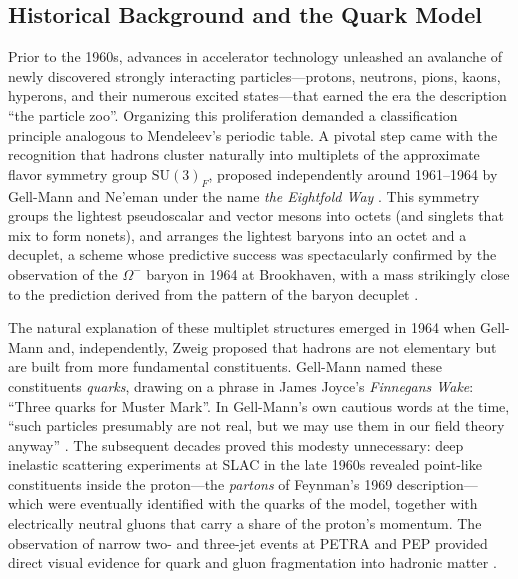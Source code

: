 \FloatBarrier

\subsection{Historical Background and the Quark Model}
\label{subsec:history-quark-model}

Prior to the 1960s, advances in accelerator technology unleashed an avalanche of
newly discovered strongly interacting particles---protons, neutrons, pions, kaons,
hyperons, and their numerous excited states---that earned the era the description
``the particle zoo''. Organizing this proliferation demanded a classification
principle analogous to Mendeleev's periodic table. A pivotal step came with the
recognition that hadrons cluster naturally into multiplets of the approximate
flavor symmetry group $\mathrm{SU(3)}_{F}$, proposed independently around
1961--1964 by Gell-Mann and Ne'eman under the name \emph{the Eightfold Way}
\cite[Ch.~2]{HalzenMartin1984}. This symmetry groups the lightest pseudoscalar and
vector mesons into octets (and singlets that mix to form nonets), and arranges the
lightest baryons into an octet and a decuplet, a scheme whose predictive success
was spectacularly confirmed by the observation of the $\Omega^-$ baryon in 1964 at
Brookhaven, with a mass strikingly close to the prediction derived from the pattern
of the baryon decuplet \cite[Ch.~7]{Amsler2018}.

The natural explanation of these multiplet structures emerged in 1964 when
Gell-Mann and, independently, Zweig proposed that hadrons are not elementary but
are built from more fundamental constituents. Gell-Mann named these constituents
\emph{quarks}, drawing on a phrase in James Joyce's \textit{Finnegans Wake}:
``Three quarks for Muster Mark''. In Gell-Mann's own cautious words at the time,
``such particles presumably are not real, but we may use them in our field theory
anyway'' \cite[Ch.~1]{Amsler2018}. The subsequent decades proved this modesty
unnecessary: deep inelastic scattering experiments at SLAC in the late 1960s
revealed point-like constituents inside the proton---the \emph{partons} of
Feynman's 1969 description---which were eventually identified with the quarks of
the model, together with electrically neutral gluons that carry a share of the
proton's momentum. The observation of narrow two- and three-jet events at PETRA
and PEP provided direct visual evidence for quark and gluon fragmentation into
hadronic matter \cite[Ch.~11]{HalzenMartin1984}.

\FloatBarrier

